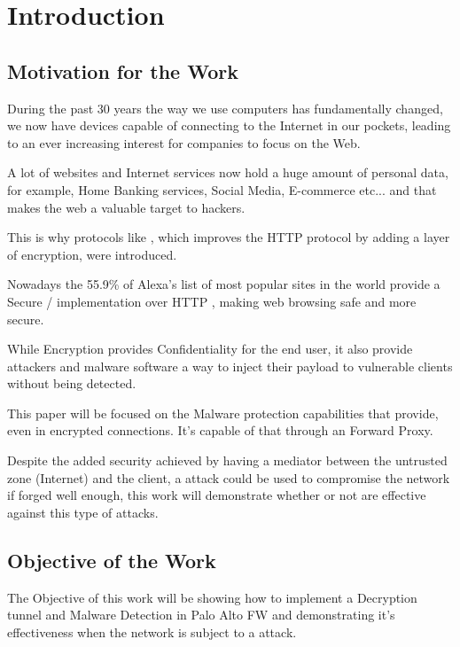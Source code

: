 \newpage



\chapter{Introduction}
\section{Motivation for the Work}

During the past 30 years the way we use computers has fundamentally changed, we now have devices capable of connecting to the Internet in our pockets, leading to an ever increasing interest for companies to focus on the Web.

A lot of websites and Internet services now hold a huge amount of personal data, for example, Home Banking services, Social Media, E-commerce etc... and that makes the web a valuable target to hackers.

This is why protocols like , which improves the HTTP protocol by adding a layer of encryption, were introduced.

Nowadays the 55.9\% of Alexa's list of most popular sites in the world provide a Secure / implementation over HTTP \cite{ssl-pulse}, making web browsing safe and more secure.

While Encryption provides Confidentiality for the end user, it also provide attackers and malware software a way to inject their payload to vulnerable clients without being detected.

This paper will be focused on the Malware protection capabilities that  provide, even in encrypted connections. It's capable of that through an  Forward Proxy.

Despite the added security achieved by having a mediator between the untrusted zone (Internet) and the client, a  attack could be used to compromise the network if forged well enough, this work will demonstrate whether or not  are effective against this type of attacks.


\section{Objective of the Work}

The Objective of this work will be showing how to implement a Decryption tunnel and Malware Detection in Palo Alto FW and demonstrating it's effectiveness when the network is subject to a  attack.

